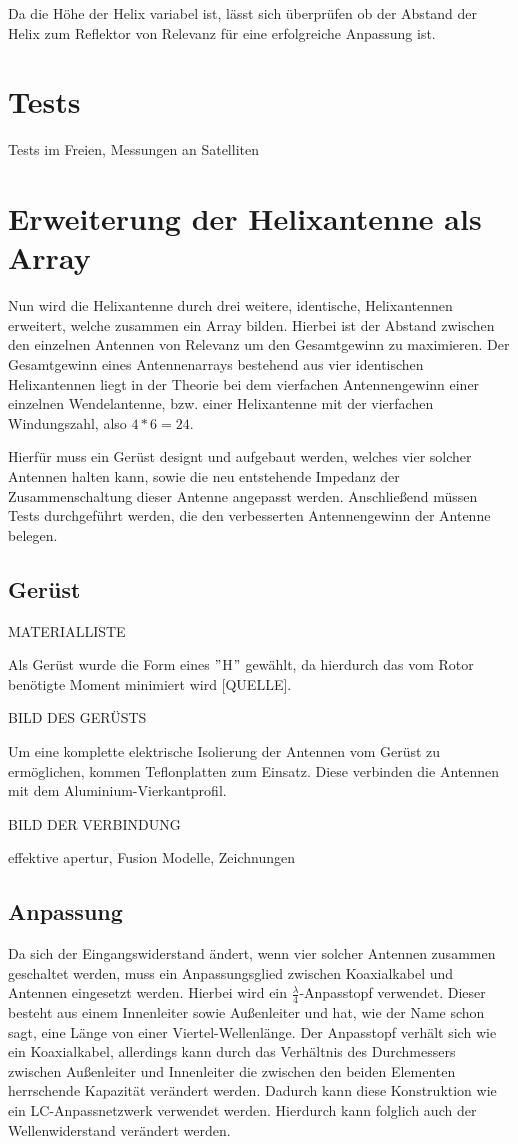 Da die Höhe der Helix variabel ist, lässt sich überprüfen ob der Abstand der Helix zum Reflektor von Relevanz für eine erfolgreiche Anpassung ist. 

\section{Tests}
Tests im Freien, Messungen an Satelliten

\section{Erweiterung der Helixantenne als Array}
Nun wird die Helixantenne durch drei weitere, identische, Helixantennen erweitert, welche zusammen ein Array bilden. Hierbei ist der Abstand zwischen den einzelnen Antennen von Relevanz um den Gesamtgewinn zu maximieren.
Der Gesamtgewinn eines Antennenarrays bestehend aus vier identischen Helixantennen liegt in der Theorie bei dem vierfachen Antennengewinn einer einzelnen Wendelantenne, bzw. einer Helixantenne mit der vierfachen Windungszahl, also $4*6=24$.

Hierfür muss ein Gerüst designt und aufgebaut werden, welches vier solcher Antennen halten kann, sowie die neu entstehende Impedanz der Zusammenschaltung dieser Antenne angepasst werden. Anschließend müssen Tests durchgeführt werden, die den verbesserten Antennengewinn der Antenne belegen.

\subsection{Gerüst}

MATERIALLISTE

Als Gerüst wurde die Form eines $"$H$"$ gewählt, da hierdurch das vom Rotor benötigte Moment minimiert wird [QUELLE]. 

BILD DES GERÜSTS

Um eine komplette elektrische Isolierung der Antennen vom Gerüst zu ermöglichen, kommen Teflonplatten zum Einsatz. Diese verbinden die Antennen mit dem Aluminium-Vierkantprofil.

BILD DER VERBINDUNG

effektive apertur, Fusion Modelle, Zeichnungen

\subsection{Anpassung}
Da sich der Eingangswiderstand ändert, wenn vier solcher Antennen zusammen geschaltet werden, muss ein Anpassungsglied zwischen Koaxialkabel und Antennen eingesetzt werden. Hierbei wird ein $\frac{\lambda}{4}$-Anpasstopf verwendet. Dieser besteht aus einem Innenleiter sowie Außenleiter und hat, wie der Name schon sagt, eine Länge von einer Viertel-Wellenlänge. Der Anpasstopf verhält sich wie ein Koaxialkabel, allerdings kann durch das Verhältnis des Durchmessers zwischen Außenleiter und Innenleiter die zwischen den beiden Elementen herrschende Kapazität verändert werden. Dadurch kann diese Konstruktion wie ein LC-Anpassnetzwerk verwendet werden. Hierdurch kann folglich auch der Wellenwiderstand verändert werden. 

